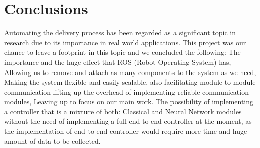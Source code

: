 \newline
\newline
\vspace{3mm}
\hfill

\section{Conclusions}
\hspace{2cm}Automating the delivery process has been regarded as a significant topic in research due to its importance in real world applications. This project was our chance to leave a footprint in this topic and we concluded the following: The importance and the huge effect that ROS (Robot Operating System) has, Allowing us to remove and attach as many components to the system as we need, Making the system flexible and easily scalable, also facilitating module-to-module communication lifting up the overhead of implementing reliable communication modules, Leaving up to focus on our main work. The possibility of implementing a controller that is a mixture of both: Classical and Neural Network modules without the need of implementing a full end-to-end controller at the moment, as the implementation of end-to-end controller would require more time and huge amount of data to be collected.
